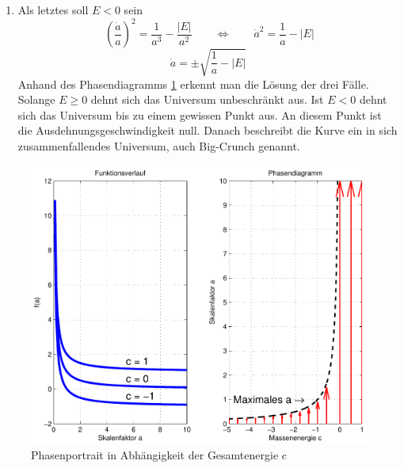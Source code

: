 \begin{refsection}
\begin{enumerate}
	\item Als letztes soll $E < 0$ sein
	\[\ \left(\frac{\dot{a}}{a} \right)^2 = \frac{1}{a^3} - \frac{|E|}{a^2} \qquad \Leftrightarrow \qquad \dot{a}^2 = \frac{1}{a} - |E|\]
	\begin{equation}
	\dot{a} = \pm \sqrt{\frac{1}{a} - |E|}
	\end{equation}
	Anhand des Phasendiagramms \ref{friedmann:phasenportrait} erkennt man die Lösung der drei Fälle. Solange $E \geq 0$ dehnt sich das Universum unbeschränkt aus. Ist $E < 0$ dehnt sich das Universum bis zu einem gewissen Punkt aus. An diesem Punkt ist die Ausdehnungsgeschwindigkeit null. Danach beschreibt die Kurve ein in sich zusammenfallendes Universum, auch Big-Crunch genannt.
	
\end{enumerate}

\begin{figure}[h]
	\centering
	\includegraphics[width  = \textwidth]{friedmann/images/phasendiagramm.pdf}
	\caption{Phasenportrait in Abhängigkeit der Gesamtenergie c
		\label{friedmann:phasenportrait}}
\end{figure}%


\end{refsection}

